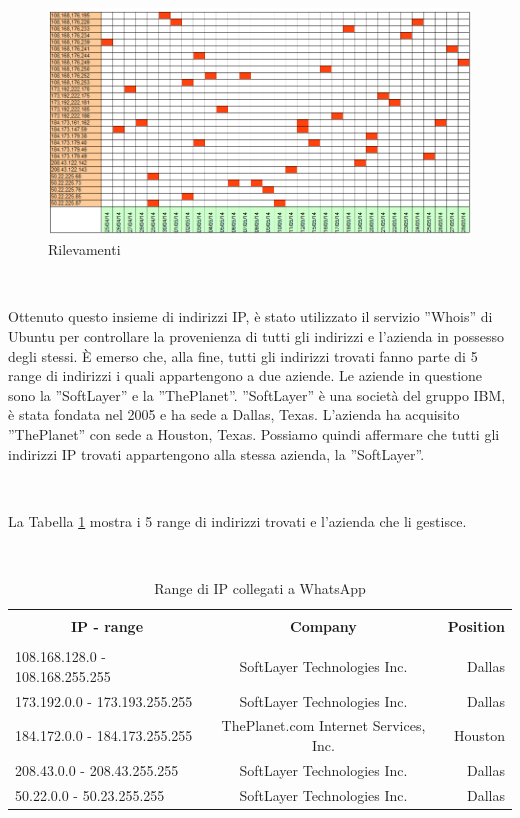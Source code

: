 \documentclass[a4paper,11pt]{book}
\begin{document}
~

\begin{figure}[!ht]
\centering
\includegraphics[scale = 0.7]{rilevazioni_30gg.png}
\caption{Rilevamenti}
\label{fig:rilevazioni}
\end{figure}

~

Ottenuto questo insieme di indirizzi IP, \`e stato utilizzato il servizio ''Whois'' di Ubuntu per controllare la provenienza di tutti gli indirizzi e l'azienda in possesso degli stessi.
\`E emerso che, alla fine, tutti gli indirizzi trovati fanno parte di 5 range di indirizzi i quali appartengono a due aziende. Le aziende in questione sono la ''SoftLayer'' e la ''ThePlanet''.
''SoftLayer'' \`e una societ\`a del gruppo IBM, \`e stata fondata nel 2005 e ha sede a Dallas, Texas. L'azienda ha acquisito ''ThePlanet'' con sede a Houston, Texas. 
Possiamo quindi affermare che tutti gli indirizzi IP trovati appartengono alla stessa azienda, la ''SoftLayer''.

~

La Tabella \ref{table:ip} mostra i 5 range di indirizzi trovati e l'azienda che li gestisce.

~

\begin{table}[!htb]
\begin{tabular}{|l|c|r|}
\hline
\multicolumn{1}{|c|}{\textbf{}} & {\textbf{}} & {\textbf{}}\\
\multicolumn{1}{|c|}{\textbf{IP - range}} & {\textbf{Company}} & {\textbf{Position}}\\
\multicolumn{1}{|c|}{\textbf{}} & {\textbf{}} & {\textbf{}}\\
\hline
108.168.128.0 - 108.168.255.255 &  SoftLayer Technologies Inc. & Dallas\\
173.192.0.0 - 173.193.255.255 &  SoftLayer Technologies Inc. & Dallas\\
184.172.0.0 - 184.173.255.255 &  ThePlanet.com Internet Services, Inc. & Houston\\
208.43.0.0 - 208.43.255.255 &  SoftLayer Technologies Inc. & Dallas\\
50.22.0.0 - 50.23.255.255 &  SoftLayer Technologies Inc. & Dallas\\
\hline
\end{tabular}
\caption{Range di IP collegati a WhatsApp}\label{table:ip}
\end{table}
\end{document}
